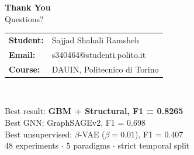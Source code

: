 \documentclass[aspectratio=169,11pt]{beamer}
\newcommand{\ok}[1]{\textcolor{good}{\textbf{#1}}}
\begin{document}
\begin{frame}[plain]
  \begin{center}
    \vspace{1.5cm}
    {\LARGE \textbf{Thank You}}\\[0.5cm]
    {\large Questions?}\\[1.5cm]
    \begin{tabular}{ll}
      \textbf{Student:} & Sajjad Shahali Ramsheh \\
      \textbf{Email:}   & s340464@studenti.polito.it \\
      \textbf{Course:}  & DAUIN, Politecnico di Torino \\
    \end{tabular}\\[1cm]
    \colorbox{primary!10}{\parbox{0.75\textwidth}{\centering\small
      Best result: \ok{GBM + Structural, F1 = 0.8265}\\
      Best GNN: GraphSAGEv2, F1 = 0.698\\
      Best unsupervised: $\beta$-VAE ($\beta{=}0.01$), F1 = 0.407\\
      48 experiments $\cdot$ 5 paradigms $\cdot$ strict temporal split
    }}
  \end{center}
\end{frame}
\end{document}

